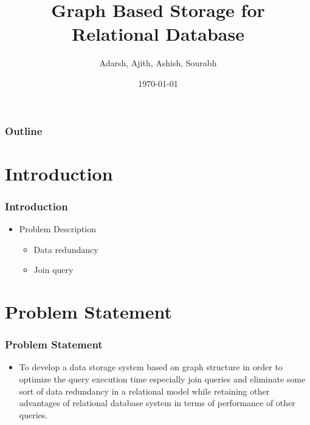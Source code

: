 \documentclass[14pt,xcolor=dvipsnames]{beamer}
\title{Graph Based Storage for Relational Database}
\author{Adarsh, Ajith, Ashish, Sourabh}
\date{\today}
\begin{document}
\begin{frame}
\titlepage
\end{frame}


\begin{frame}
\frametitle{Outline}
\begin{multicols}{2}
\tableofcontents[hideallsubsections]
\end{multicols}
\end{frame}

\section{Introduction}
\begin{frame}
\frametitle{Introduction}
\begin{itemize} 
 \item Problem Description
  \begin{itemize}
    \item Data redundancy
    \item Join query
  \end{itemize}
\end{itemize}
\end{frame}

\section{Problem Statement}
\begin{frame}
\frametitle{Problem Statement}
\begin{itemize}
  \item To develop a data storage system based on graph structure in order to optimize the query execution time especially join queries and eliminate some sort of data redundancy in a relational model while retaining other advantages of relational database system in terms of performance of other queries.
\end{itemize}
\end{frame}
\end{document}
